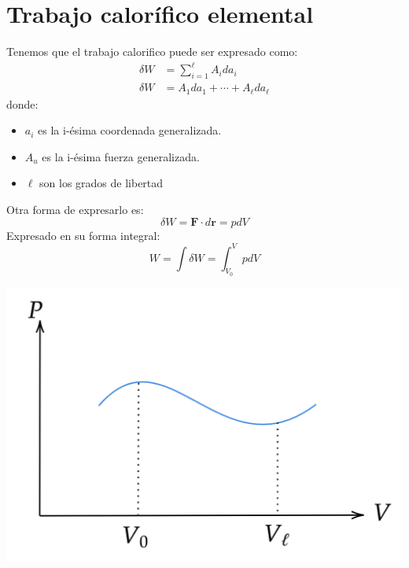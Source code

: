 \documentclass[../main]{subfiles}
\begin{document}
\section{Trabajo calorífico elemental}
Tenemos que el trabajo calorifico puede ser expresado como:
\begin{align}
    \delta W&=\sum_{i=1}^{\ell} A_i d a_i \\
    \delta W&=A_1 da_1+\cdots + A_{\ell} da_{\ell}
\end{align}
donde:
\begin{itemize}
    \item $a_i$ es la i-ésima coordenada generalizada.
    \item $A_u$ es la i-ésima fuerza generalizada.
    \item $\ell$ son los grados de libertad
\end{itemize}
\begin{minipage}{0.5\textwidth}
   Otra forma de expresarlo es:
    \begin{equation}
        \delta W=\mathbf{F} \cdot d \mathbf{r}=pdV
    \end{equation}
    Expresado en su forma integral:
    \begin{equation}
        W=\int \delta W=\int_{V_0}^{V}p dV
    \end{equation} 
\end{minipage}
\begin{minipage}{0.5\textwidth}
   \includegraphics[scale=0.23]{Termodinámica/images/diagram-20230116.png}
\end{minipage}
\end{document}
